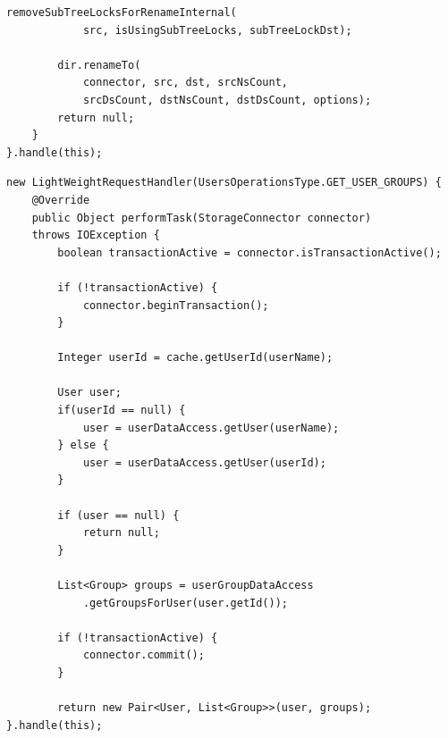 \begin{lstlisting}[label={lst:trh}, caption={Transactional request handler for the rename operation}]
        removeSubTreeLocksForRenameInternal(
            src, isUsingSubTreeLocks, subTreeLockDst);

        dir.renameTo(
            connector, src, dst, srcNsCount,
            srcDsCount, dstNsCount, dstDsCount, options);
        return null;
    }
}.handle(this);
\end{lstlisting}

\begin{lstlisting}[label={lst:lrh}, caption={Lightweight request handler }]
new LightWeightRequestHandler(UsersOperationsType.GET_USER_GROUPS) {
    @Override
    public Object performTask(StorageConnector connector)
    throws IOException {
        boolean transactionActive = connector.isTransactionActive();

        if (!transactionActive) {
            connector.beginTransaction();
        }

        Integer userId = cache.getUserId(userName);
        
        User user;
        if(userId == null) {
            user = userDataAccess.getUser(userName);
        } else {
            user = userDataAccess.getUser(userId);
        }

        if (user == null) {
            return null;
        }

        List<Group> groups = userGroupDataAccess
            .getGroupsForUser(user.getId());

        if (!transactionActive) {
            connector.commit();
        }

        return new Pair<User, List<Group>>(user, groups);
}.handle(this);
\end{lstlisting}